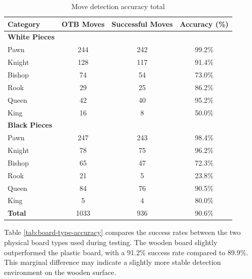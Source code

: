 \begin{table}[htbp]
\centering
\caption{Move detection accuracy total}
\label{tab:accuracy-total}
\begin{tabular}{lccc}
\toprule
\textbf{Category} & \textbf{OTB Moves} & \textbf{Successful Moves} & \textbf{Accuracy (\%)} \\
\midrule
\textbf{White Pieces} & & & \\
\hspace{1em}Pawn  & 244 & 242 & 99.2\% \\
\hspace{1em}Knight & 128 & 117 & 91.4\% \\
\hspace{1em}Bishop & 74  & 54  & 73.0\% \\
\hspace{1em}Rook   & 29  & 25  & 86.2\% \\
\hspace{1em}Queen  & 42  & 40  & 95.2\% \\
\hspace{1em}King   & 16  & 8   & 50.0\% \\
\midrule
\textbf{Black Pieces} & & & \\
\hspace{1em}Pawn  & 247 & 243 & 98.4\% \\
\hspace{1em}Knight & 78  & 75  & 96.2\% \\
\hspace{1em}Bishop & 65  & 47  & 72.3\% \\
\hspace{1em}Rook   & 21  & 5   & 23.8\% \\
\hspace{1em}Queen  & 84  & 76  & 90.5\% \\
\hspace{1em}King   & 5   & 4   & 80.0\% \\
\midrule
\textbf{Total} & 1033 & 936 & 90.6\% \\
\bottomrule
\end{tabular}
\end{table}


Table \ref{tab:board-type-accuracy} compares the success rates between the two physical board types used during testing. The wooden board slightly outperformed the plastic board, with a 91.2\% success rate compared to 89.9\%. This marginal difference may indicate a slightly more stable detection environment on the wooden surface. \\


